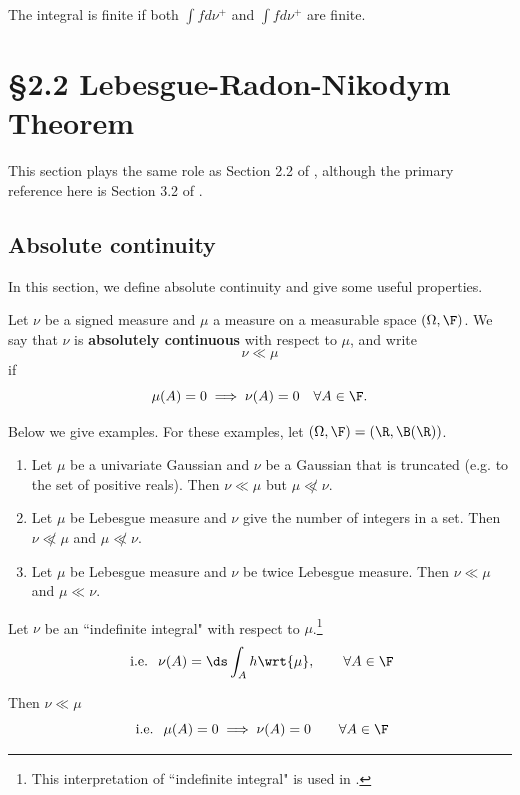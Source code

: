 \documentclass{article} %
\newif\ifActive
\newcommand{\dmu}{\wrt{\mu}}
\begin{document}
The integral is finite if both $\int f d\nu^+$ and $\int f d\nu^+$ are finite. 




\section{\S 2.2 Lebesgue-Radon-Nikodym Theorem}

This section plays the same role as Section 2.2 of \cite{ash2000probability}, although the primary reference here is Section 3.2 of \cite{folland1999real}.

\subsection{Absolute continuity}

In this section, we define absolute continuity and give some useful properties.

\begin{definition}
Let $\nu$ be a signed measure and $\mu$ a measure on a measurable space $(\Omega, \F)$.  We say that $\nu$ is \textbf{absolutely continuous} with respect to $\mu$, and write
\[ \nu \ll \mu \]
if 
\[ \mu(A) = 0 \implies \nu(A) = 0 \quad \forall A \in \F. \]
\label{def:absolute_continuity}	
\end{definition}

\begin{example}

Below we give examples.  For these examples, let $(\Omega, \F) = (\R, \B(\R))$.

\ifActive
\textbf{Workshop Discussion:} Can you think of any examples?
\else 
	\begin{enumerate}
	\item Let $\mu$ be a univariate Gaussian and $\nu$ be a Gaussian that is truncated (e.g. to the set of positive reals).  Then $\nu \ll \mu$ but $\mu \not\ll \nu$.
	\item Let $\mu$ be Lebesgue measure and $\nu$ give the number of integers in a set.  Then $\nu \not\ll \mu$ and $\mu \not\ll \nu$.
	\item Let $\mu$ be Lebesgue measure and $\nu$ be twice Lebesgue measure.  Then $\nu \ll \mu$ and $\mu \ll \nu$.
	\end{enumerate}
\fi 
\label{ex:examples_with_absolute_continuity}
\end{example}


\begin{remark}{}

Let $\nu$ be an ``indefinite integral" with respect to $\mu$.\footnote{This interpretation of ``indefinite integral" is used in \cite[pp.~61]{ash2000probability}.}
\[ \text{ i.e. } \; \nu(A) = \ds\int_A h \dmu, \quad \quad \forall A \in \F \]

Then $\nu \ll \mu$
\[ \text{ i.e. } \; \mu(A) = 0 \implies \nu(A) = 0  \quad \quad \forall A \in \F \]
\label{rk:indefinite_integrals_are_absolutely_continuous}
\end{remark}
\end{document}
